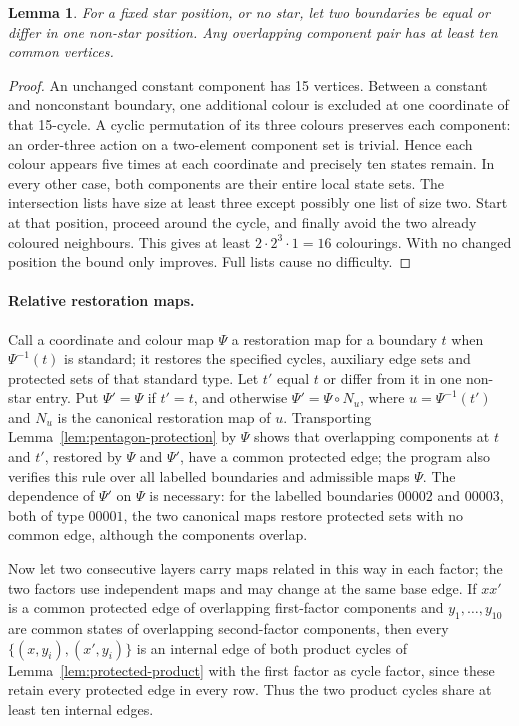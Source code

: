\documentclass[11pt]{article}
\newtheorem{lemma}[theorem]{Lemma}
\theoremstyle{remark}
\numberwithin{equation}{section}
\numberwithin{table}{section}
\begin{document}
\begin{lemma}\label{lem:pentagon-overlap}
For a fixed star position, or no star, let two boundaries be equal or
differ in one non-star position. Any overlapping component pair has
at least ten common vertices.
\end{lemma}
\begin{proof}
An unchanged constant component has 15 vertices. Between a constant
and nonconstant boundary, one additional colour is excluded at one
coordinate of that 15-cycle. A cyclic permutation of its three colours
preserves each component: an order-three action on a two-element
component set is trivial. Hence each colour appears five times at
each coordinate and precisely ten states remain.
In every other case, both components are their entire local state
sets. The intersection lists have size at least three except possibly
one list of size two. Start at that position, proceed around the
cycle, and finally avoid the two already coloured neighbours.
This gives at least $2\cdot2^3\cdot1=16$ colourings. With no changed
position the bound only improves. Full lists cause no difficulty.
\end{proof}

\paragraph{Relative restoration maps.}
Call a coordinate and colour map $\Psi$ a restoration map for a
boundary $t$ when $\Psi^{-1}(t)$ is standard; it restores the
specified cycles, auxiliary edge sets and protected sets of that standard type. Let
$t'$ equal $t$ or differ from it in one non-star entry. Put
$\Psi'=\Psi$ if $t'=t$, and otherwise $\Psi'=\Psi\circ N_u$, where
$u=\Psi^{-1}(t')$ and $N_u$ is the canonical restoration map of $u$.
Transporting Lemma~\ref{lem:pentagon-protection} by $\Psi$ shows that
overlapping components at $t$ and $t'$, restored by $\Psi$ and
$\Psi'$, have a common protected edge; the program also verifies this
rule over all labelled boundaries and admissible maps $\Psi$. The
dependence of $\Psi'$ on $\Psi$ is necessary: for the labelled
boundaries $00002$ and $00003$, both of type $00001$, the two canonical
maps restore protected sets with no common edge, although the
components overlap.

Now let two consecutive layers carry maps related in this way in each
factor; the two factors use independent maps and may change at the same
base edge. If $xx'$ is a common protected edge of overlapping
first-factor components and $y_1,\ldots,y_{10}$ are common states of
overlapping second-factor components, then every
$\{(x,y_i),(x',y_i)\}$ is an internal edge of both product cycles of
Lemma~\ref{lem:protected-product} with the first factor as cycle
factor, since these retain every protected edge in every row. Thus the
two product cycles share at least ten internal edges.
\end{document}
